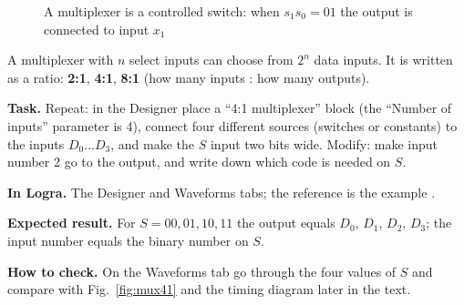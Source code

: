 \begin{figure}[H]
\centering
{}
\caption{A multiplexer is a controlled switch: when $s_1s_0 = 01$ the output is
connected to input $x_1$}
\end{figure}

A multiplexer with $n$ select inputs can choose from $2^n$ data inputs. It is
written as a ratio: \textbf{2:1}, \textbf{4:1}, \textbf{8:1} (how many inputs :
how many outputs).

\begin{diybox}
\textbf{Task.}  Repeat: in the Designer place a ``4:1 multiplexer''
block (the ``Number of inputs'' parameter is 4), connect four different sources
(switches or constants) to the inputs $D_0\ldots D_3$, and make the $S$ input
two bits wide.  Modify: make input number 2 go to the output, and write
down which code is needed on $S$.

\textbf{In Logra.} The Designer and Waveforms tabs; the reference is the example
.

\textbf{Expected result.} For $S=00,01,10,11$ the output equals $D_0$, $D_1$,
$D_2$, $D_3$; the input number equals the binary number on $S$.

\textbf{How to check.} On the Waveforms tab go through the four values of $S$
and compare with Fig.~\ref{fig:mux41} and the timing diagram later in the text.
\end{diybox}

